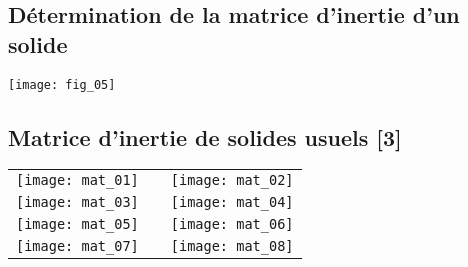 \subsection{Détermination de la matrice d'inertie d'un solide \cite{2}}

\begin{center}
\texttt{[image: fig\_05]}
\end{center}

\subsection{Matrice d'inertie de solides usuels [3]}

\begin{table*}[!h]
\begin{center}
\begin{tabular}{ccc}
\texttt{[image: mat\_01]} & &
\texttt{[image: mat\_02]} \\ 
\texttt{[image: mat\_03]} & &
\texttt{[image: mat\_04]} \\ 
\texttt{[image: mat\_05]} & &
\texttt{[image: mat\_06]} \\ 
\texttt{[image: mat\_07]} & &
\texttt{[image: mat\_08]} \\ 
\end{tabular}
\end{center}
\end{table*}



